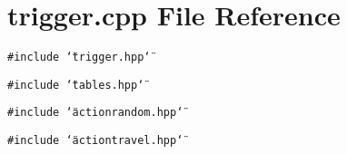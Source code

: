 \section{trigger.cpp File Reference}
\label{trigger_8cpp}
{\tt \#include \char`\"{}trigger.hpp\char`\"{}}\par
{\tt \#include \char`\"{}tables.hpp\char`\"{}}\par
{\tt \#include \char`\"{}actionrandom.hpp\char`\"{}}\par
{\tt \#include \char`\"{}actiontravel.hpp\char`\"{}}\par
